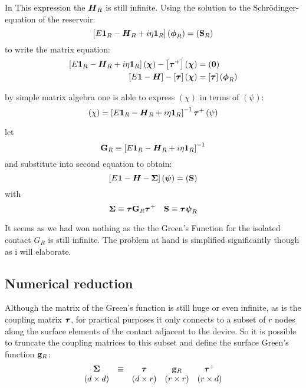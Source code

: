 In This expression the $\boldsymbol{H}_R$ is still infinite.
Using the solution to the Schr\"odinger-equation of the reservoir:
\begin{equation}
	\left[E\boldsymbol{1}_R - \boldsymbol{H}_R +i\eta\boldsymbol{1}_R\right]\left(\mbox{\boldmath$ \phi $}_R\right) = \left(\mathbf{S}_R\right)
	\label{schroedinger contact}
\end{equation}
to write the matrix equation:
\begin{align}
	\left[E\boldsymbol{1}_R - \boldsymbol{H}_R +i\eta\boldsymbol{1}_R\right]\left(\mbox{\boldmath$ \chi $}\right)-\left[\mbox{\boldmath$ \tau $}^{+}\right]\left(\mbox{\boldmath$ \chi $}\right) &= \left(\mathbf{0}\right) \\
	\left[E\boldsymbol{1} - \boldsymbol{H} \right] -\left[\mbox{\boldmath$ \tau $}\right]\left(\mbox{\boldmath$ \chi $}\right) &= \left[\mbox{\boldmath$ \tau $}\right]\left(\mbox{\boldmath$ \phi $}_R\right)
	\label{separated green's function}
\end{align}

by simple matrix algebra one is able to express $\left(\chi\right)$ in terms of $\left(\psi\right)$:
\begin{equation}
	\left(\chi\right) = \left[E\boldsymbol{1}_R - \boldsymbol{H}_R +i\eta\boldsymbol{1}_R\right]^{-1} \mbox{\boldmath$ \tau $}^+ \left(\psi\right)
	\label{chi}
\end{equation}

let 
\begin{equation}
	\mathbf{G}_R \equiv \left[E\boldsymbol{1}_R - \boldsymbol{H}_R +i\eta\boldsymbol{1}_R\right]^{-1}
	\label{Green's function reservoir}
\end{equation}
and substitute into second equation to obtain:
\begin{equation}
	\left[ E\boldsymbol{1} - \boldsymbol{H} -\mbox{\boldmath$ \Sigma $} \right] \left(\mbox{\boldmath$ \psi $}\right) = \left(\mathbf{S}\right)
	\label{}
\end{equation}
with
\begin{equation}
	\mbox{\boldmath$ \Sigma $} \equiv \mbox{\boldmath$ \tau $} \mathbf{G}_R \mbox{\boldmath$ \tau $}^{+} \quad \mathbf{S} \equiv \mbox{\boldmath$ \tau $} \mbox{\boldmath$ \psi $}_R
	\label{Sigmadef}
\end{equation}

It seems as we had won nothing as the the Green's Function for the isolated contact $G_R$ is still infinite.
The problem at hand is simplified significantly though as i will elaborate.
\subsection*{Numerical reduction}
Although the matrix of the Green's function is still huge or even infinite, as is the coupling matrix $\mbox{\boldmath$ \tau $}$, for practical purposes
it only connects to a subset of $r$ nodes along the surface elements of the contact adjacent to the device. So it is possible to truncate the coupling matrices
to this subset and define the surface Green's function $\mathbf{g}_R$:
\begin{equation}
	\begin{matrix}
		\mbox{\boldmath$ \Sigma $} &\equiv &\mbox{\boldmath$ \tau $} &\mathbf{g}_R &\mbox{\boldmath$ \tau $}^+\\
		(d \times d) & & (d \times r) &(r \times r) &(r \times d)
	\end{matrix}
	\label{Sigmasubset}
\end{equation}

